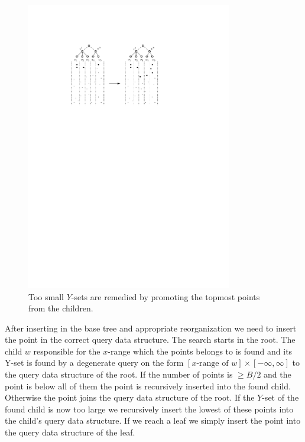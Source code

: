 \documentclass[twoside,11pt,openright]{report}
\begin{document}
\begin{figure}[h]
	\centering
	\includegraphics[width=0.8\textwidth]{../figures/arge_split_2}
	\caption{Too small $Y$-sets are remedied by promoting the topmost points from the children.}
	\label{fig:arge_split_2}
\end{figure}

After inserting in the base tree and appropriate reorganization we need to insert the point in the correct query data structure. The search starts in the root. The child $w$ responsible for the $x$-range which the points belongs to is found and its Y-set is found by a degenerate query on the form  $\left[ x\text{-range of }w \right] \times \left[ - \infty, \infty \right]$ to the query data structure of the root. If the number of points is $\geq B/2$ and the point is below all of them the point is recursively inserted into the found child. Otherwise the point joins the query data structure of the root. If the $Y$-set of the found child is now too large we recursively insert the lowest of these points into the child's query data structure.
If we reach a leaf we simply insert the point into the query data structure of the leaf.
\end{document}
